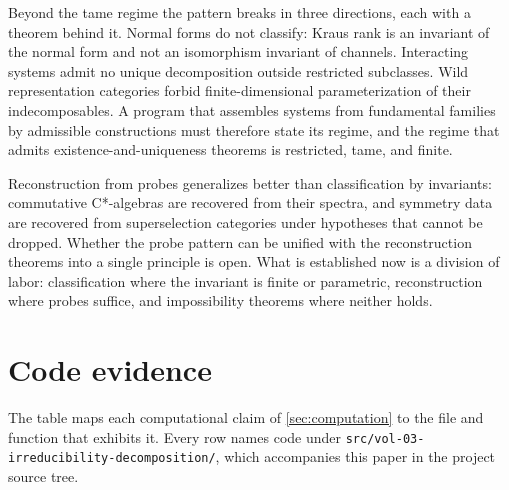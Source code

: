 \documentclass[11pt,letterpaper]{article}
\theoremstyle{definition}
\theoremstyle{remark}
\begin{document}
Beyond the tame regime the pattern breaks in three directions, each with a theorem behind it. Normal forms do not classify: Kraus rank is an invariant of the normal form and not an isomorphism invariant of channels. Interacting systems admit no unique decomposition outside restricted subclasses. Wild representation categories forbid finite-dimensional parameterization of their indecomposables. A program that assembles systems from fundamental families by admissible constructions must therefore state its regime, and the regime that admits existence-and-uniqueness theorems is restricted, tame, and finite.

Reconstruction from probes generalizes better than classification by invariants: commutative C*-algebras are recovered from their spectra, and symmetry data are recovered from superselection categories under hypotheses that cannot be dropped. Whether the probe pattern can be unified with the reconstruction theorems into a single principle is open. What is established now is a division of labor: classification where the invariant is finite or parametric, reconstruction where probes suffice, and impossibility theorems where neither holds.

\appendix
\section{Code evidence}

The table maps each computational claim of \cref{sec:computation} to the file and function that exhibits it. Every row names code under \texttt{src/vol-03-irreducibility-decomposition/}, which accompanies this paper in the project source tree.
\end{document}
